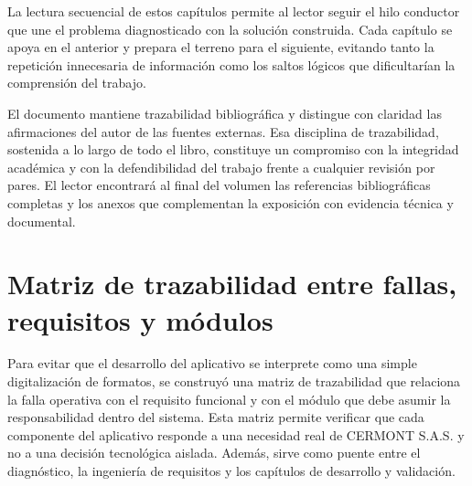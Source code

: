La lectura secuencial de estos capítulos permite al lector seguir el hilo conductor que une el problema diagnosticado con la solución construida. Cada capítulo se apoya en el anterior y prepara el terreno para el siguiente, evitando tanto la repetición innecesaria de información como los saltos lógicos que dificultarían la comprensión del trabajo.

El documento mantiene trazabilidad bibliográfica y distingue con claridad las afirmaciones del autor de las fuentes externas. Esa disciplina de trazabilidad, sostenida a lo largo de todo el libro, constituye un compromiso con la integridad académica y con la defendibilidad del trabajo frente a cualquier revisión por pares. El lector encontrará al final del volumen las referencias bibliográficas completas y los anexos que complementan la exposición con evidencia técnica y documental.

\section{Matriz de trazabilidad entre fallas, requisitos y módulos}
\label{sec:matriz-fallas-requisitos-modulos}

Para evitar que el desarrollo del aplicativo se interprete como una simple digitalización de formatos, se construyó una matriz de trazabilidad que relaciona la falla operativa con el requisito funcional y con el módulo que debe asumir la responsabilidad dentro del sistema. Esta matriz permite verificar que cada componente del aplicativo responde a una necesidad real de CERMONT S.A.S. y no a una decisión tecnológica aislada. Además, sirve como puente entre el diagnóstico, la ingeniería de requisitos y los capítulos de desarrollo y validación.

